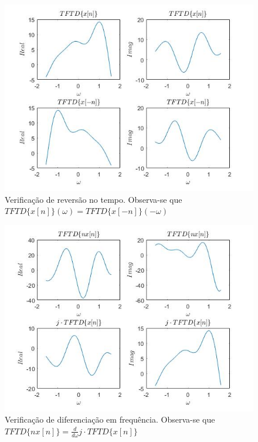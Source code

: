 \documentclass[a4paper, 12pt]{article}
\begin{document}
\begin{figure}[H]
	\centering
	\includegraphics[scale=0.7]{img6.jpg} 
	\caption{Verificação de reversão no tempo. Observa-se que $TFTD \lbrace x[n]\rbrace (\omega) = TFTD \lbrace x[-n]\rbrace (-\omega )$}
	\label{fig:6}
\end{figure}

\begin{figure}[H]
	\centering
	\includegraphics[scale=0.7]{img7.jpg} 
	\caption{Verificação de diferenciação em frequência. Observa-se que $TFTD \lbrace nx[n]\rbrace = \frac{d}{d\omega}j\cdot TFTD \lbrace x[n]\rbrace$}
	\label{fig:7}
\end{figure}
\end{document}
